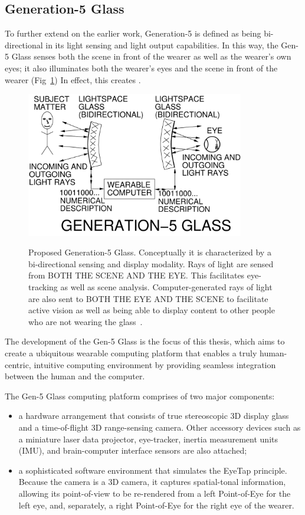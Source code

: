 \subsection{Generation-5 Glass}
To further extend on the earlier work, Generation-5 is defined as being bi-directional in its light sensing 
and light output capabilities.  In this way, the Gen-5 Glass senses both the scene in front of the wearer 
as well as the wearer's
own eyes; it also illuminates both the wearer's eyes and the scene in front of the wearer 
(Fig~\ref{fig:genfive})
In effect, this creates . 

\begin{figure}
  \centering
  \includegraphics[width=3.75in]{ch6/figs/GL455.pdf}\\
  \caption{Proposed Generation-5 Glass.  Conceptually it is characterized
           by a bi-directional sensing and display modality.  Rays of light
           are sensed from BOTH THE SCENE AND THE EYE.  This facilitates
           eye-tracking as well as scene analysis. Computer-generated rays of light are also sent to 
BOTH THE
           EYE AND THE SCENE to facilitate active vision as well as
           being able to display content to other people who are not wearing
           the glass~\cite{mann2013freeglass}.}
  \label{fig:genfive}
\end{figure}

The development of the Gen-5 Glass is the focus of this thesis, which aims to create a ubiquitous 
wearable computing platform that enables a truly human-centric, intuitive computing environment by 
providing seamless integration between the human and the computer.

The Gen-5 Glass computing platform comprises of two major components:
\begin{itemize}
  \item a hardware arrangement that consists of true stereoscopic 3D display glass and a time-of-flight 
3D range-sensing camera.  Other accessory devices such as a
        miniature laser data projector, eye-tracker, inertia measurement units (IMU), and brain-computer 
interface   sensors are also attached;
  \item a sophisticated software environment that simulates the EyeTap
        principle.  Because the camera is a 3D camera, it captures spatial-tonal
        information, allowing its point-of-view to be re-rendered from a
        left Point-of-Eye for the left eye, and, separately, a
        right Point-of-Eye for the right eye of the wearer.
\end{itemize}

